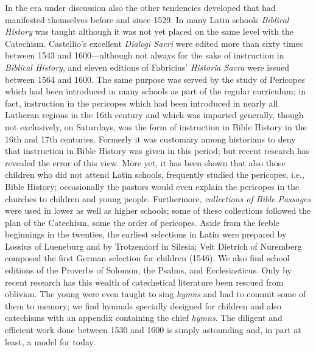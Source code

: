 In the era under discussion also the other tendencies developed that had manifested themselves before and since 1529. In many Latin schools \emph{Biblical History} was taught although it was not yet placed on the same level with the Catechism. Castellio’s excellent \emph{Dialogi Sacri} were edited more than sixty times between 1543 and 1600—although not always for the sake of instruction in \emph{Biblical History}, and eleven editions of Fabricius’ \emph{Historia Sacra} were issued between 1564 and 1600. The same purpose was served by the study of Pericopes which had been introduced in many schools as part of the regular curriculum; in fact, instruction in the pericopes which had been introduced in nearly all Lutheran regions in the 16th century and which was imparted generally, though not exclusively, on Saturdays, was the form of instruction in Bible History in the 16th and 17th centuries. Formerly it was customary among historians to deny that instruction in Bible History was given in this period; but recent research has revealed the error of this view.
More yet, it has been shown that also those children who did not attend Latin schools, frequently studied the pericopes, i.e., Bible History; occasionally the pastors would even explain the pericopes in the churches to children and young people. Furthermore, \emph{collections of Bible Passages} were used in lower as well as higher schools; some of these collections followed the plan of the Catechism, some the order of pericopes. Aside from the feeble beginnings in the twenties, the earliest selections in Latin were prepared by Lossius of Lueneburg and by Trotzendorf in Silesia; Veit Dietrich of Nuremberg composed the first German selection for children (1546). We also find school editions of the Proverbs of Solomon, the Psalms, and Ecclesiasticus. Only by recent research has this wealth of catechetical literature been rescued from oblivion. The young were even taught to sing \emph{hymns} and had to commit some of them to memory; we find hymnals specially designed for children and also catechisms with an appendix containing the chief \emph{hymns}. The diligent and efficient work done between 1530 and 1600 is simply astounding and, in part at least, a model for today.

